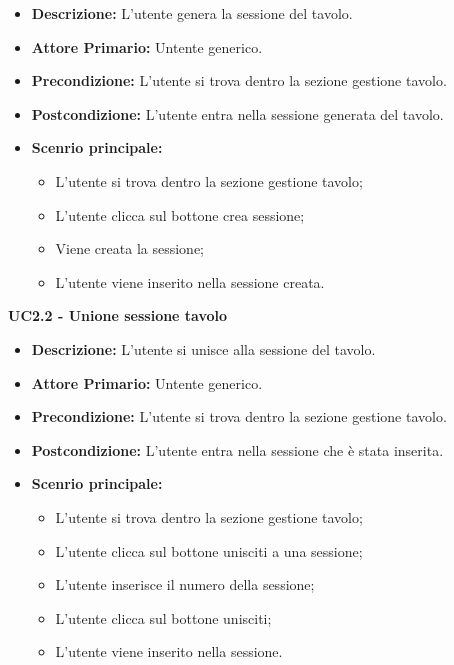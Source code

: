 \begin{itemize}
    \item \textbf{Descrizione:} L'utente genera la sessione del tavolo.
    \item \textbf{Attore Primario:} Untente generico.
    \item \textbf{Precondizione:} L'utente si trova dentro la sezione gestione tavolo.
    \item \textbf{Postcondizione:} L'utente entra nella sessione generata del tavolo.
    \item \textbf{Scenrio principale:}
    \begin{itemize}
        \item L'utente si trova dentro la sezione gestione tavolo;
        \item L'utente clicca sul bottone crea sessione;
        \item Viene creata la sessione;
        \item L'utente viene inserito nella sessione creata.
    \end{itemize}
\end{itemize}
\textbf{UC2.2 - Unione sessione tavolo}
\begin{itemize}
    \item \textbf{Descrizione:} L'utente si unisce alla sessione del tavolo.
    \item \textbf{Attore Primario:} Untente generico.
    \item \textbf{Precondizione:} L'utente si trova dentro la sezione gestione tavolo.
    \item \textbf{Postcondizione:} L'utente entra nella sessione che è stata inserita.
    \item \textbf{Scenrio principale:}
    \begin{itemize}
        \item L'utente si trova dentro la sezione gestione tavolo;
        \item L'utente clicca sul bottone unisciti a una sessione;
        \item L'utente inserisce il numero della sessione;
        \item L'utente clicca sul bottone unisciti;
        \item L'utente viene inserito nella sessione.
    \end{itemize}
\end{itemize}
